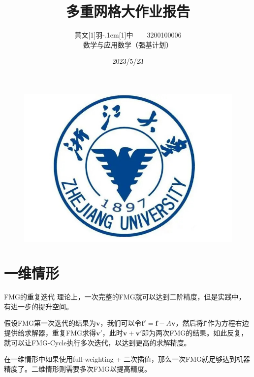 \documentclass[9pt]{beamer}
\title{多重网格大作业报告}
\institute{浙江大学\ \ \ \ 数学科学学院}
\date{2023/5/23}
\begin{document}
\author{黄文\hbox{\scalebox{0.6}[1]{羽}\kern-.1em\scalebox{0.5}[1]{中}}\ \ \ \ 3200100006\\ 数学与应用数学（强基计划）}

\kaishu
\begin{frame}
    \titlepage
    \begin{figure}[htpb]
        \begin{center}
            \vspace*{-0.5cm}
            \includegraphics[width=0.2\linewidth]{pic/zju.jpg}
        \end{center}
    \end{figure}
\end{frame}

\begin{frame}
    \tableofcontents[sectionstyle=show,subsectionstyle=show/shaded/hide,subsubsectionstyle=show/shaded/hide]
\end{frame}


\section{一维情形}

\begin{frame}{FMG的重复迭代}
理论上，一次完整的FMG就可以达到二阶精度，但是实践中，有进一步的提升空间。
\vspace{1em}

假设FMG第一次迭代的结果为$\mathbf{v}$，我们可以令$\mathbf{f}'=\mathbf{f}-A\mathbf{v}$，然后将$\mathbf{f'}$作为方程右边提供给求解器，重复FMG求得$\mathbf{v}'$，此时$\mathbf{v}+\mathbf{v}'$即为两次FMG的结果。如此反复，就可以让FMG-Cycle执行多次迭代，以达到更高的求解精度。
\vspace{1em}

在一维情形中如果使用full-weighting + 二次插值，那么一次FMG就足够达到机器精度了。二维情形则需要多次FMG以提高精度。
\end{frame}
\end{document}
